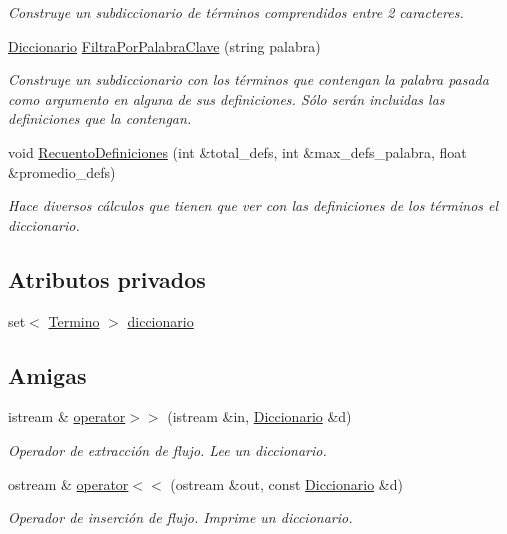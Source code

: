 \begin{DoxyCompactItemize}
\begin{DoxyCompactList}\small\item\em Construye un subdiccionario de términos comprendidos entre 2 caracteres. \end{DoxyCompactList}\item 
\hyperlink{classDiccionario}{Diccionario} \hyperlink{classDiccionario_a20b621eb60d2e7dda2175b543484f6b2}{Filtra\+Por\+Palabra\+Clave} (string palabra)
\begin{DoxyCompactList}\small\item\em Construye un subdiccionario con los términos que contengan la palabra pasada como argumento en alguna de sus definiciones. Sólo serán incluidas las definiciones que la contengan. \end{DoxyCompactList}\item 
void \hyperlink{classDiccionario_a3f5e319cf231c4156fdf071e529b2142}{Recuento\+Definiciones} (int \&total\+\_\+defs, int \&max\+\_\+defs\+\_\+palabra, float \&promedio\+\_\+defs)
\begin{DoxyCompactList}\small\item\em Hace diversos cálculos que tienen que ver con las definiciones de los términos el diccionario. \end{DoxyCompactList}\end{DoxyCompactItemize}
\subsection*{Atributos privados}
\begin{DoxyCompactItemize}
\item 
set$<$ \hyperlink{classTermino}{Termino} $>$ \hyperlink{classDiccionario_a2715031923b30792221622bfa773189c}{diccionario}
\end{DoxyCompactItemize}
\subsection*{Amigas}
\begin{DoxyCompactItemize}
\item 
istream \& \hyperlink{classDiccionario_acf72932a86e98d33aef771dde204a44d}{operator$>$$>$} (istream \&in, \hyperlink{classDiccionario}{Diccionario} \&d)
\begin{DoxyCompactList}\small\item\em Operador de extracción de flujo. Lee un diccionario. \end{DoxyCompactList}\item 
ostream \& \hyperlink{classDiccionario_aeb8c0d19c5f4c9d9680ab42b51dbb38e}{operator$<$$<$} (ostream \&out, const \hyperlink{classDiccionario}{Diccionario} \&d)
\begin{DoxyCompactList}\small\item\em Operador de inserción de flujo. Imprime un diccionario. \end{DoxyCompactList}\end{DoxyCompactItemize}


